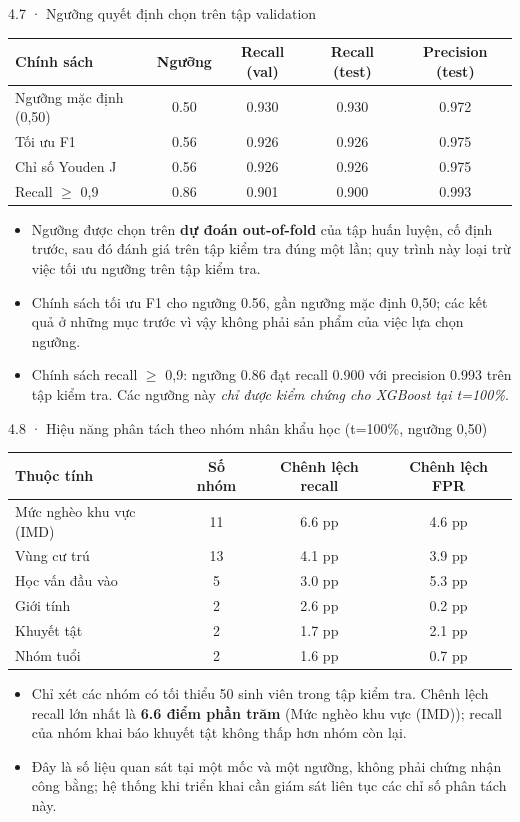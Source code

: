 \documentclass[aspectratio=169,11pt]{beamer}
\begin{document}
\begin{frame}{4.7 · Ngưỡng quyết định chọn trên tập validation}
\centering\small
\begin{tabular}{@{}lcccc@{}}
\toprule
\textbf{Chính sách} & \textbf{Ngưỡng} & \textbf{Recall (val)} & \textbf{Recall (test)} & \textbf{Precision (test)} \\
\midrule
    Ngưỡng mặc định (0,50) & 0.50 & 0.930 & 0.930 & 0.972 \\
    Tối ưu F1 & 0.56 & 0.926 & 0.926 & 0.975 \\
    Chỉ số Youden J & 0.56 & 0.926 & 0.926 & 0.975 \\
    Recall $\geq$ 0,9 & 0.86 & 0.901 & 0.900 & 0.993 \\
\bottomrule
\end{tabular}
\vspace{3mm}
\begin{itemize}\small
  \item Ngưỡng được chọn trên \textbf{dự đoán out-of-fold} của tập huấn luyện, cố định trước, sau đó đánh giá trên tập kiểm tra đúng một lần; quy trình này loại trừ việc tối ưu ngưỡng trên tập kiểm tra.
  \item Chính sách tối ưu F1 cho ngưỡng 0.56, gần ngưỡng mặc định 0,50; các kết quả ở những mục trước vì vậy không phải sản phẩm của việc lựa chọn ngưỡng.
  \item Chính sách recall $\geq$ 0,9: ngưỡng 0.86 đạt recall 0.900 với precision 0.993 trên tập kiểm tra. Các ngưỡng này \emph{chỉ được kiểm chứng cho XGBoost tại t=100\%}.
\end{itemize}
\end{frame}

\begin{frame}{4.8 · Hiệu năng phân tách theo nhóm nhân khẩu học (t=100\%, ngưỡng 0,50)}
\centering\small
\begin{tabular}{@{}lccc@{}}
\toprule
\textbf{Thuộc tính} & \textbf{Số nhóm} & \textbf{Chênh lệch recall} & \textbf{Chênh lệch FPR} \\
\midrule
    Mức nghèo khu vực (IMD) & 11 & 6.6 pp & 4.6 pp \\
    Vùng cư trú & 13 & 4.1 pp & 3.9 pp \\
    Học vấn đầu vào & 5 & 3.0 pp & 5.3 pp \\
    Giới tính & 2 & 2.6 pp & 0.2 pp \\
    Khuyết tật & 2 & 1.7 pp & 2.1 pp \\
    Nhóm tuổi & 2 & 1.6 pp & 0.7 pp \\
\bottomrule
\end{tabular}
\vspace{3mm}
\begin{itemize}\small
  \item Chỉ xét các nhóm có tối thiểu 50 sinh viên trong tập kiểm tra. Chênh lệch recall lớn nhất là \textbf{6.6 điểm phần trăm} (Mức nghèo khu vực (IMD)); recall của nhóm khai báo khuyết tật không thấp hơn nhóm còn lại.
  \item Đây là số liệu quan sát tại một mốc và một ngưỡng, không phải chứng nhận công bằng; hệ thống khi triển khai cần giám sát liên tục các chỉ số phân tách này.
\end{itemize}
\end{frame}
\end{document}

